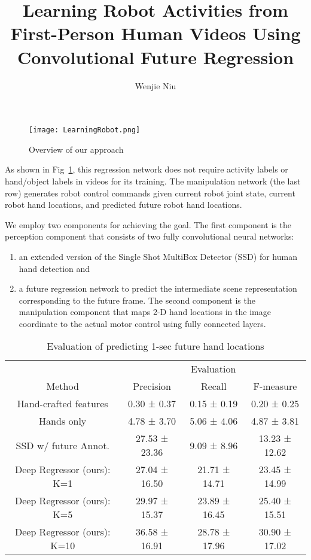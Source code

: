\documentclass{article}
\author{Wenjie Niu}
\title{Learning Robot Activities from First-Person Human Videos Using Convolutional Future Regression}
\begin{document}
 
\maketitle
\begin{figure}[H]
\centering
 \texttt{[image: LearningRobot.png]} 
 \caption{Overview of our approach}  
 \label{fig:LearningRobot}
 \end{figure}
As shown in Fig~\ref{fig:LearningRobot}, this regression network does not require activity labels or hand/object labels in videos for its training. The manipulation network (the last row) generates robot control commands given current robot joint state, current robot hand locations, and predicted future robot hand locations.\par
\cite{Lee_2017_CVPR_Workshops}We employ two components for achieving the goal. The first component is the perception component that consists of two fully convolutional neural networks: 
\begin{enumerate}
\item an extended version of the Single Shot MultiBox Detector (SSD) for human hand detection and
\item a future regression network to predict the intermediate scene representation corresponding to the future frame. The second component is the manipulation component that maps 2-D hand locations in the image coordinate to the actual motor control using fully connected layers.\par
\end{enumerate}
\begin{table}
\centering
\begin{tabular}{cccc}
 \toprule
 	& \multicolumn{3}{c}{Evaluation} \\
 \cmidrule{2-4}
 	Method & Precision & Recall & F-measure \\
 \midrule
Hand-crafted features & 0.30 ± 0.37 & 0.15 ± 0.19 & 0.20 ± 0.25 \\
Hands only & 4.78 ± 3.70 & 5.06 ± 4.06 & 4.87 ± 3.81 \\
SSD w/ future Annot. & 27.53 ± 23.36 & 9.09 ± 8.96 & 13.23 ± 12.62 \\
Deep Regressor (ours): K=1 & 27.04 ± 16.50 & 21.71 ± 14.71 & 23.45 ± 14.99 \\
Deep Regressor (ours): K=5 & 29.97 ± 15.37 & 23.89 ± 16.45 & 25.40 ± 15.51 \\
Deep Regressor (ours): K=10 & 36.58 ± 16.91 & 28.78 ± 17.96 & 30.90 ± 17.02 \\
\bottomrule
\end{tabular}
\caption{Evaluation of predicting 1-sec future hand locations}
\label{Tab:experiment}
\end{table}\par
\end{document}
